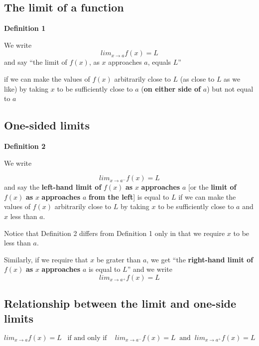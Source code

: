 \documentclass[]{book}
\begin{document}
\hypertarget{the-limit-of-a-function}{%
\subsection*{The limit of a function}\label{the-limit-of-a-function}}

\textbf{Definition 1}

We write \[lim_{x\to a}f(x)=L\] and say ``the limit of \(f(x)\), as \(x\) approaches \(a\), equals \(L\)''

if we can make the values of \(f(x)\) arbitrarily close to \(L\) (as close to \(L\) as we like) by taking \(x\) to be sufficiently close to \(a\) (\textbf{on either side of} \(a\)) but not equal to \(a\)

\hypertarget{one-sided-limits}{%
\subsection*{One-sided limits}\label{one-sided-limits}}

\textbf{Definition 2}

We write

\[lim_{x\to a^-}f(x)=L\]
and say the \textbf{left-hand limit of} \(f(x)\) \textbf{as} \(x\) \textbf{approaches} \(a\) {[}or the \textbf{limit of} \(f(x)\) \textbf{as} \(x\) \textbf{approaches} \(a\) \textbf{from the left}{]} is equal to \(L\) if we can make the values of \(f(x)\) arbitrarily close to \(L\) by taking \(x\) to be sufficiently close to \(a\) and \(x\) less than \(a\).

Notice that Definition 2 differs from Definition 1 only in that we require \(x\) to be less than \(a\).

Similarly, if we require that \(x\) be grater than \(a\), we get ``the \textbf{right-hand limit of} \(f(x)\) \textbf{as} \(x\) \textbf{approaches} \(a\) is equal to \(L\)'' and we write
\[lim_{x\to a^+}f(x)=L\]

\hypertarget{relationship-between-the-limit-and-one-side-limits}{%
\subsection{Relationship between the limit and one-side limits}\label{relationship-between-the-limit-and-one-side-limits}}

\[lim_{x\to a}f(x)=L \;\;\;\text{if and only if }\;\;\; lim_{x\to a^-}f(x)=L \;\;\text{and}\;\; lim_{x\to a^+}f(x)=L\]
\end{document}
